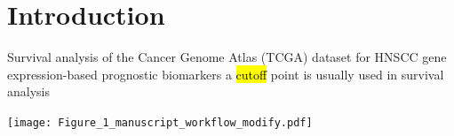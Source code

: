 \documentclass[
paper=landscape,
paper=160mm:90mm, %
fontsize=11pt, %
pagesize, %
parskip=half-, %
]{scrartcl} %
\theoremstyle{mythmstyle} %
\begin{document}
\thispagestyle{empty} %

\small\tableofcontents %

\clearpage








\section{Introduction}




\begin{minipage}[c]{0.30\linewidth}
\begin{outline}
    \1 Survival analysis of the Cancer Genome Atlas (TCGA) dataset for HNSCC
        \2 gene expression-based prognostic biomarkers
        \2 a \hl{cutoff} point is usually used in survival analysis
\end{outline}
\end{minipage}%
\begin{minipage}[c]{0.65\linewidth}
    \raggedright
    \hfill\texttt{[image: Figure\_1\_manuscript\_workflow\_modify.pdf]}
\end{minipage}




\clearpage
\end{document}
